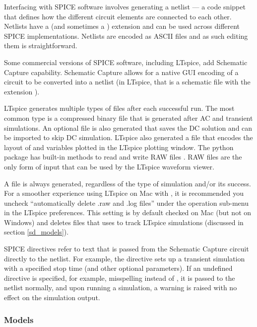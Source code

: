 Interfacing with SPICE software involves generating a netlist --- a code snippet that defines
how the different circuit elements are connected to each other. Netlists have a  (and 
sometimes a ) extension and can be used across different SPICE implementations. 
Netlists are encoded as ASCII files and as such editing them is straightforward.

Some commercial versions of SPICE
software, including LTspice, add Schematic Capture capability. Schematic Capture allows for a
native GUI encoding of a circuit to be converted into a netlist (in LTspice, that is a 
schematic file with the extension ).

LTspice generates multiple types of files after each successful run. The most common type is 
a compressed binary  file that is generated after AC and transient simulations. An
optional  file is also generated that saves the DC solution and can be imported
to skip DC simulation. LTspice also generated a  file that encodes the layout of and
variables plotted in the LTspice plotting window. The python package 
has built-in methods to read and write RAW files \cite{pyltspice}. RAW files
are the only form of input that can be used by the LTspice waveform viewer.

A  file is always generated, 
regardless of the type of simulation and/or its success. For a smoother experience using LTspice on Mac with , it is
recommended you uncheck ``automatically delete .raw and .log files'' under the operation sub-menu
in the LTspice preferences. This setting is by default checked on Mac (but not on Windows) and
deletes files that  uses to track LTspice simulations (discussed in section \ref{sd_models}).

SPICE directives refer to text that is passed from the Schematic Capture circuit directly to the netlist.
For example, the  directive sets up a transient simulation with a specified stop time (and other
optional parameters). If an undefined directive is specified, for example, misspelling  instead of , it is passed to the netlist normally, and upon running a simulation, a warning is raised
with no effect on the simulation output.

\subsubsection{Models}

